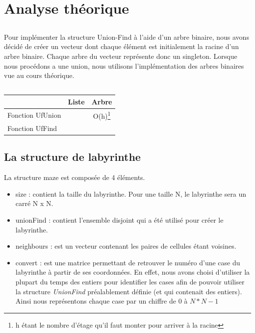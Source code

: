 
\usepackage{clrscode3e}





\section{Analyse théorique}
\subsection{} %
	Pour implémenter la structure Union-Find à l'aide d'un arbre binaire, nous avons décidé de créer un vecteur dont chaque élément est initialement la racine d'un arbre binaire. Chaque arbre du vecteur représente donc un singleton. Lorsque nous procédons a une union, nous utilisons l'implémentation des arbres binaires vue au cours théorique.

\subsection{} %
	\begin{tabular}{|l||c|c|}
	\hline
  & Liste & Arbre\\
  \hline\hline
  Fonction UfUnion & & O(h)\footnote{h étant le nombre d'étage qu'il faut monter pour arriver à la racine} \\
  Fonction UfFind & &
  \\
  \hline
\end{tabular}

\subsection{} %
\subsection{} %

\subsection{La structure de labyrinthe} %
La structure maze est composée de 4 éléments.
\begin{itemize}
\item size : contient la taille du labyrinthe. Pour une taille N, le labyrinthe sera un carré N x N.
\item unionFind : contient l'ensemble disjoint qui a été utilisé pour créer le labyrinthe.
\item neighbours : est un vecteur contenant les paires de cellules étant voisines.
\item convert : est une matrice permettant de retrouver le numéro d'une case du labyrinthe à partir de ses coordonnées.
\bigbreak
En effet, nous avons choisi d'utiliser la plupart du temps des entiers pour identifier les cases afin de pouvoir utiliser la structure \textit{UnionFind} préalablement définie (et qui contenait des entiers). Ainsi nous représentons chaque case par un chiffre de $0$ à $N *N - 1$
\end{itemize}


